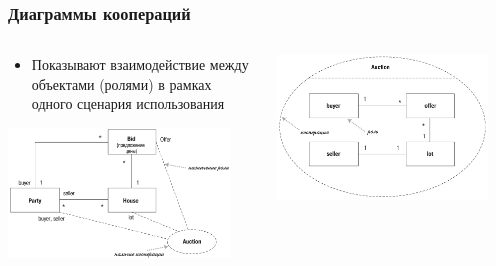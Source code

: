 \documentclass{../mcsslides}
\begin{document}
    \begin{frame}
        \frametitle{Диаграммы коопераций}
        \begin{columns}
            \begin{column}{0.5\textwidth}
                \begin{itemize}
                    \item Показывают взаимодействие между объектами (ролями) в рамках одного сценария использования
                \end{itemize}
                \vspace{3mm}
                \begin{center}
                    \includegraphics[width=0.9\textwidth]{cooperationAlternateNotation.png}
                \end{center}
            \end{column}
            \begin{column}{0.5\textwidth}
                \begin{center}
                    \includegraphics[width=0.9\textwidth]{cooperationDiagram.png}
                \end{center}
            \end{column}
        \end{columns}
    \end{frame}
\end{document}
